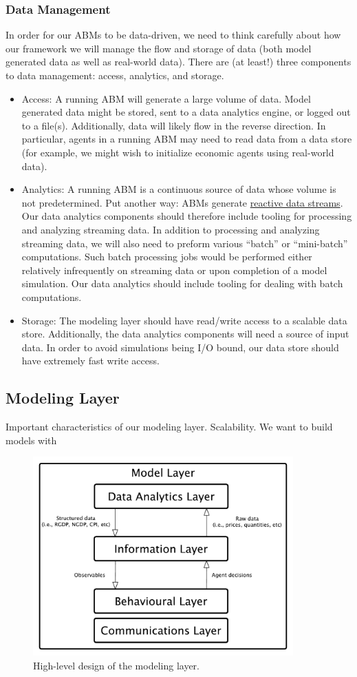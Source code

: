 \documentclass[11pt]{amsart}
\begin{document}
\subsubsection{Data Management}
In order for our ABMs to be data-driven, we need to think carefully about how our framework we will manage the flow and storage of data (both model generated data as well as real-world data). There are (at least!) three components to data management: access, analytics, and storage.
\begin{itemize}
    \item Access: A running ABM will generate a large volume of data. Model generated data might be stored, sent to a data analytics engine, or logged out to a file(s). Additionally, data will likely flow in the reverse direction.  In particular, agents in a running ABM may need to read data from a data store (for example, we might wish to initialize economic agents using real-world data).
    \item Analytics: A running ABM is a continuous source of data whose volume is not predetermined. Put another way: ABMs generate \href{http://www.reactive-streams.org/}{reactive data streams}.  Our data analytics components should therefore include tooling for processing and analyzing streaming data. In addition to processing and analyzing streaming data, we will also need to preform various ``batch'' or ``mini-batch'' computations. Such batch processing jobs would be performed either relatively infrequently on streaming data or upon completion of a model simulation. Our data analytics should include tooling for dealing with batch computations.
    \item Storage: The modeling layer should have read/write access to a scalable data store. Additionally, the data analytics components will need a source of input data. In order to avoid simulations being I/O bound, our data store should have extremely fast write access.
\end{itemize}

\subsection{Modeling Layer}
Important characteristics of our modeling layer.  Scalability. We want to build models with 
\begin{figure}[H]
\centering
\includegraphics[width=10cm]{img/coarse-grain-model-layer.pdf}
\caption{High-level design of the modeling layer.}
\end{figure}
\end{document}
